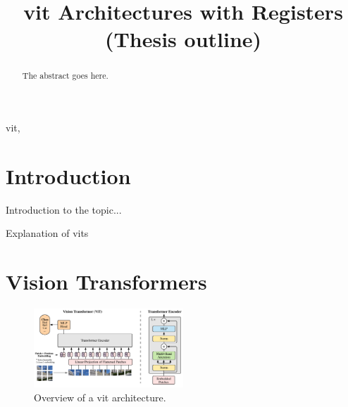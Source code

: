 \documentclass[conference]{IEEEtran}
\begin{document}
  \title{\acl{vit} Architectures with Registers (Thesis outline)}

  \author{
    }

  \maketitle
  \begin{abstract}
  The abstract goes here.
  \end{abstract}

  \begin{IEEEkeywords}
    \ac{vit}, 
    \end{IEEEkeywords}

  \IEEEpeerreviewmaketitle

  \section{Introduction}
  Introduction to the topic...

  Explanation of \acp{vit} \cite{10.1145/3505244} \cite{visiontransformers2021} \cite{vit-state-challenges} \cite{Liu2024-lm}

  \section{Vision Transformers}

  \begin{figure}
    \centering
    \includegraphics[width=0.5\textwidth]{figures/vit-architecture.png}
    \caption{Overview of a \ac{vit} architecture. \cite{visiontransformers2021}}
    \label{fig:vit-architecture}
  \end{figure}
\end{document}
